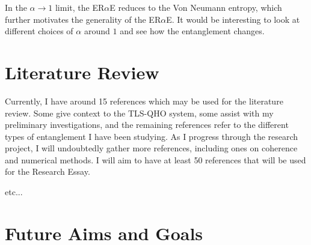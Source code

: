 \documentclass[12pt,a4paper]{article}
\begin{document}
In the $\alpha \to 1$ limit, the ER$\alpha$E reduces to the Von Neumann entropy, which further motivates the generality of the ER$\alpha$E. It would be interesting to look at different choices of $\alpha$ around $1$ and see how the entanglement changes. 


\section{Literature Review}
Currently, I have around 15 references which may be used for the literature review. Some give context to the TLS-QHO system, some assist with my preliminary investigations, and the remaining references refer to the different types of entanglement I have been studying. As I progress through the research project, I will undoubtedly gather more references, including ones on coherence and numerical methods. I will aim to have at least 50 references that will be used for the Research Essay.

etc...


\section{Future Aims and Goals}



\newpage

 
 
\end{document}
